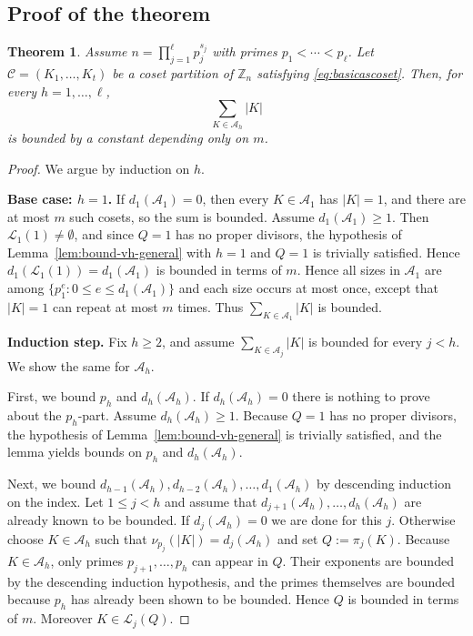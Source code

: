 \documentclass[11pt,reqno]{amsart}
\newtheorem{theorem}{Theorem}[section]
\theoremstyle{definition}
\newcommand{\Z}{\mathbb{Z}}
\newcommand{\Cset}{\mathcal{C}}
\newcommand{\Aset}{\mathcal{A}}
\newcommand{\Lset}{\mathcal{L}}
\begin{document}
\subsection{Proof of the theorem}

\begin{theorem}\label{thm:main}
Assume \(n=\prod_{j=1}^{\ell} p_j^{s_j}\) with primes \( p_1<\cdots<p_\ell\).
Let \(\Cset=(K_1,\dots,K_t)\) be a coset partition of \(\Z_n\) satisfying \eqref{eq:basicascoset}.
Then, for every \(h=1,\dots,\ell\),
\[
\sum_{K\in\Aset_h}|K|
\]
is bounded by a constant depending only on \(m\).
\end{theorem}

\begin{proof}
We argue by induction on \(h\).

\smallskip\noindent\textbf{Base case: \(h=1\).}
If \(d_1(\Aset_1)=0\), then every \(K\in\Aset_1\) has \(|K|=1\), and there are at most \(m\) such cosets, so the sum is bounded.
Assume \(d_1(\Aset_1)\ge1\).
Then \(\Lset_1(1)\neq\emptyset\), and since \(Q=1\) has no proper divisors,
the hypothesis of Lemma~\ref{lem:bound-vh-general} with \(h=1\) and \(Q = 1\) is trivially satisfied.
Hence \(d_1(\Lset_1(1))=d_1(\Aset_1)\) is bounded in terms of \(m\).
Hence all sizes in \(\Aset_1\) are among \(\{p_1^e:0\le e\le d_1(\Aset_1)\}\) and each size occurs at most once, except that \(|K|=1\) can repeat at most \(m\) times.
Thus \(\sum_{K\in\Aset_1}|K|\) is bounded.

\smallskip\noindent\textbf{Induction step.}
Fix \(h\ge2\), and assume \(\sum_{K\in\Aset_j}|K|\) is bounded for every \(j<h\).
We show the same for \(\Aset_h\).

First, we bound \(p_h\) and \(d_h(\Aset_h)\). If \(d_h(\Aset_h)=0\) there is nothing to prove about the \(p_h\)-part.
Assume \(d_h(\Aset_h)\ge1\).
Because \(Q=1\) has no proper divisors, the hypothesis of Lemma~\ref{lem:bound-vh-general}
is trivially satisfied, and the lemma yields bounds on \(p_h\) and \(d_h(\Aset_h)\).

Next, we bound \(d_{h-1}(\Aset_h),d_{h-2}(\Aset_h),\dots,d_1(\Aset_h)\) by descending induction on the index.
Let \(1\le j<h\) and assume that \(d_{j+1}(\Aset_h),\dots,d_h(\Aset_h)\) are already known to be bounded.
If \(d_j(\Aset_h)=0\) we are done for this \(j\).
Otherwise choose \(K\in\Aset_h\) such that \(\nu_{p_j}(|K|) = d_j(\Aset_h)\) and set
\(
Q:=\pi_j(K).
\)
Because \(K\in\Aset_h\), only primes \(p_{j+1},\dots,p_h\) can appear in \(Q\).
Their exponents are bounded by the descending induction hypothesis, and the primes themselves are bounded
because \(p_h\) has already been shown to be bounded. Hence \(Q\) is bounded in terms of \(m\).
Moreover \(K\in\Lset_j(Q)\).


\end{proof}
\end{document}
